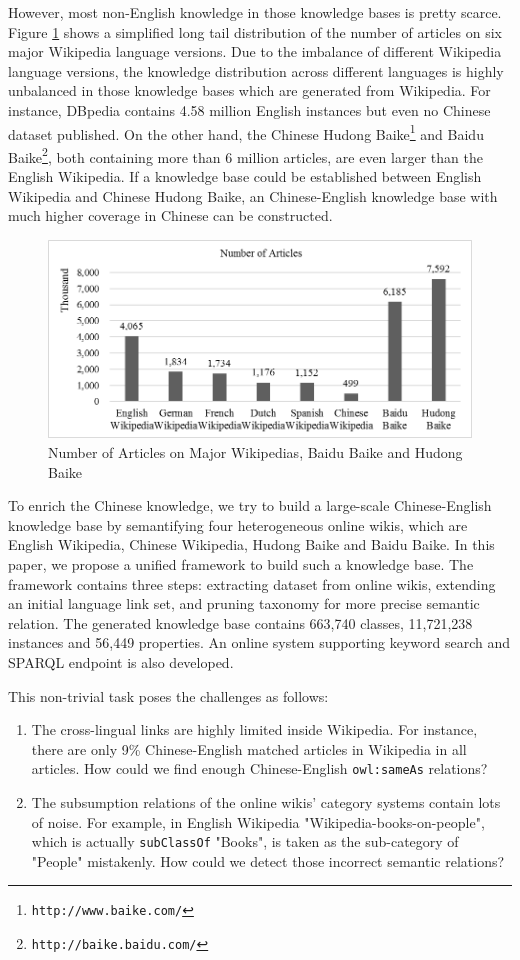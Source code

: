 \documentclass[runningheads,a4paper]{llncs}
\begin{document}
However, most non-English knowledge in those knowledge bases is pretty scarce. Figure \ref{fig_stat} shows a simplified long tail distribution of the number of articles on six major Wikipedia language versions. Due to the imbalance of different Wikipedia language versions, the knowledge distribution across different languages is highly unbalanced in those knowledge bases which are generated from Wikipedia. For instance, DBpedia contains 4.58 million English instances but even no Chinese dataset published. On the other hand, the Chinese Hudong Baike\footnote{{\tt http://www.baike.com/}} and Baidu Baike\footnote{{\tt http://baike.baidu.com/}}, both containing more than 6 million articles, are even larger than the English Wikipedia. If a knowledge base could be established between English Wikipedia and Chinese Hudong Baike, an Chinese-English knowledge base with much higher coverage in Chinese can be constructed.

\begin{figure}[ht]
\centering
\includegraphics[width=0.75 \columnwidth]{fig/fig_stat.png}
\caption{Number of Articles on Major Wikipedias, Baidu Baike and Hudong Baike}
\label{fig_stat}
\end{figure}

To enrich the Chinese knowledge, we try to build a large-scale Chinese-English knowledge base by semantifying four heterogeneous online wikis, which are English Wikipedia, Chinese Wikipedia, Hudong Baike and Baidu Baike. In this paper, we propose a unified framework to build such a knowledge base. The framework contains three steps: extracting dataset from online wikis, extending an initial language link set, and pruning taxonomy for more precise semantic relation. The generated knowledge base contains 663,740 classes, 11,721,238 instances and 56,449 properties. An online system supporting keyword search and SPARQL endpoint is also developed.

This non-trivial task poses the challenges as follows:
\begin{enumerate}
  \item The cross-lingual links are highly limited inside Wikipedia. For instance, there are only 9\% Chinese-English matched articles in Wikipedia in all articles. How could we find enough Chinese-English \verb"owl:sameAs" relations?
  \item The subsumption relations of the online wikis' category systems contain lots of noise. For example, in English Wikipedia "Wikipedia-books-on-people", which is actually \verb"subClassOf" "Books", is taken as the sub-category of "People" mistakenly. How could we detect those incorrect semantic relations?
\end{enumerate}
\end{document}
